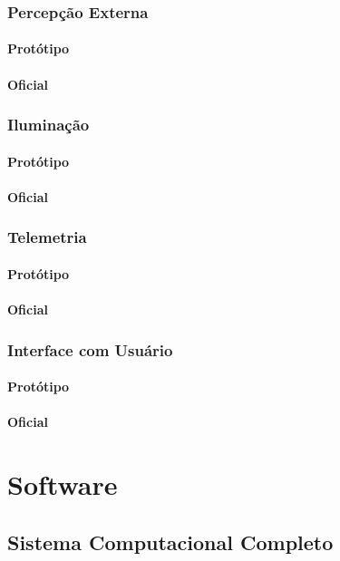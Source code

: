 \documentclass[]{politex}
\begin{document}
\section{Percepção Externa}
\subsection{Protótipo}
\subsection{Oficial}
\section{Iluminação}
\subsection{Protótipo}
\subsection{Oficial}
\section{Telemetria}
\subsection{Protótipo}
\subsection{Oficial}
\section{Interface com Usuário}
\subsection{Protótipo}
\subsection{Oficial}

\part{Software}
\chapter{Sistema Computacional Completo}
\end{document}
